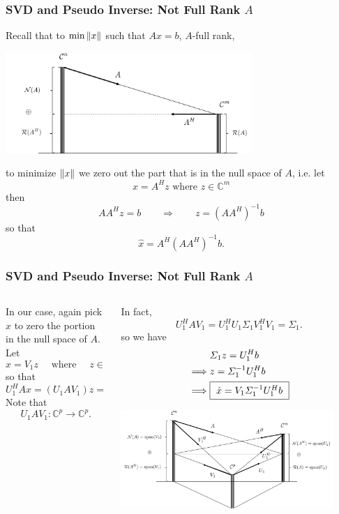 \documentclass{beamer}
\begin{document}
\begin{frame}\frametitle{SVD and Pseudo Inverse: Not Full Rank $A$}
	\par{}
	
	Recall that to $\min\left\|x\right\|$ such that $Ax = b$, $A$-full rank,
	\begin{center}
		\includegraphics[width=0.7\textwidth]
			{figures/chap7_svd_3}
	\end{center}
	to minimize $\left\|x\right\|$ we zero out the part that is in the null space of $A$, i.e. let
	\[ 
		x = A^Hz \text{ where } z \in \mathbb{C}^m 
	\]
	then
	\[ 
		AA^Hz = b 
		\qquad \Rightarrow \qquad 
		z = (AA^H)^{-1}b 
	\]
	so that
	\[ 
		\hat{x} = A^H(AA^H)^{-1}b.
	\]
\end{frame}

\begin{frame}\frametitle{SVD and Pseudo Inverse: Not Full Rank $A$}
	\begin{columns}
		\begin{column}{0.5\textwidth}
			In our case, again pick $x$ to zero the portion in the null space of $A$.  Let
			\[ 
				x = V_1z \quad \text{ where }  \quad z \in \mathbb{C}^p 
			\] 
			so that 
			\[ 
				U_1^HAx = \left(U_1AV_1\right) z = U_1^Hb. 
			\]	
			Note that 
			\[
				U_1AV_1: \mathbb{C}^p \to \mathbb{C}^p.
			\]
		\end{column}
		\begin{column}{0.5\textwidth}
			In fact,
			\[ 
				U_1^H A V_1 = U_1^H U_1 \Sigma_1 V_1^H V_1 = \Sigma_1.
			\]
			so we have
			\begin{align*}
				& \Sigma_1 z = U_1^Hb \\
				\implies & z = \Sigma_1^{-1}U_1^Hb \\
				\implies & \fbox{ $\hat{x} = V_1\Sigma_1^{-1}U_1^Hb$ }
			\end{align*}
			\begin{center}
				\includegraphics[width=0.9\textwidth]
					{figures/chap7_svd_1}
			\end{center}					
		\end{column}
	\end{columns}


	
\end{frame}
\end{document}
